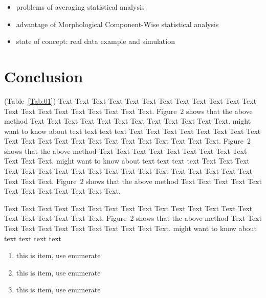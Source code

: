 \documentclass{bioinfo}
\begin{document}
\begin{itemize}
\item problems of averaging statistical analysis
\item advantage of Morphological Component-Wise statistical analysis
\item state of concept: real data example and simulation
\end{itemize}









%
%






\section{Conclusion}

(Table~\ref{Tab:01}) Text Text Text Text Text Text  Text Text Text
Text Text Text Text Text Text  Text Text Text Text Text Text.
Figure~2\vphantom{\ref{fig:02}} shows that the above method  Text
Text Text Text  Text Text Text Text Text Text  Text Text.
\citealp{Boffelli03} might want to know about  text text text text
Text Text Text Text Text Text  Text Text Text Text Text Text Text
Text Text  Text Text Text Text Text Text.
Figure~2\vphantom{\ref{fig:02}} shows that the above method  Text
Text Text Text  Text Text Text Text Text Text  Text Text.
\citealp{Boffelli03} might want to know about  text text text text
Text Text Text Text Text Text Text Text Text Text Text Text Text
Text Text  Text Text Text Text Text Text.
Figure~2\vphantom{\ref{fig:02}} shows that the above method  Text
Text Text Text  Text Text Text Text Text Text  Text Text.



Text Text Text Text Text Text  Text Text Text Text Text Text Text
Text Text  Text Text Text Text Text Text.
Figure~2\vphantom{\ref{fig:02}} shows that the above method  Text
Text Text Text  Text Text Text Text Text Text  Text Text.
\citealp{Boffelli03} might want to know about  text text text text

\begin{enumerate}
\item this is item, use enumerate
\item this is item, use enumerate
\item this is item, use enumerate
\end{enumerate}
\end{document}
